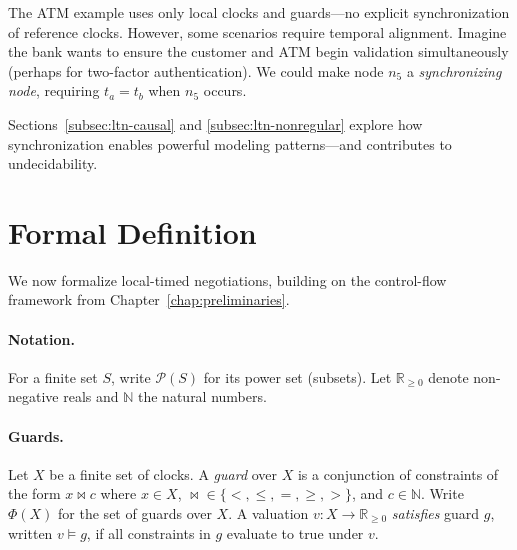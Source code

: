 The ATM example uses only local clocks and guards—no explicit synchronization of reference clocks. However, some scenarios require temporal alignment. Imagine the bank wants to ensure the customer and ATM begin validation simultaneously (perhaps for two-factor authentication). We could make node $n_5$ a \emph{synchronizing node}, requiring $t_a = t_b$ when $n_5$ occurs.

Sections~\ref{subsec:ltn-causal} and \ref{subsec:ltn-nonregular} explore how synchronization enables powerful modeling patterns—and contributes to undecidability.


\section{Formal Definition}
\label{sec:ltn-def}

We now formalize local-timed negotiations, building on the control-flow framework from Chapter~\ref{chap:preliminaries}.

\paragraph{Notation.} For a finite set $S$, write $\mathcal{P}(S)$ for its power set (subsets). Let $\mathbb{R}_{\geq 0}$ denote non-negative reals and $\mathbb{N}$ the natural numbers.

\paragraph{Guards.} Let $X$ be a finite set of clocks. A \emph{guard} over $X$ is a conjunction of constraints of the form $x \bowtie c$ where $x \in X$, $\bowtie \in \{<, \leq, =, \geq, >\}$, and $c \in \mathbb{N}$. Write $\Phi(X)$ for the set of guards over $X$. A valuation $v : X \to \mathbb{R}_{\geq 0}$ \emph{satisfies} guard $g$, written $v \models g$, if all constraints in $g$ evaluate to true under $v$.

